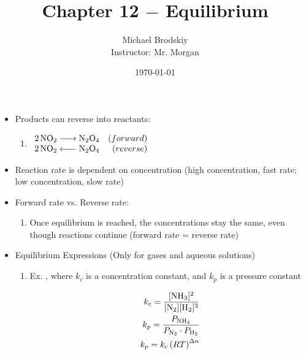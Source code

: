 \documentclass[12pt]{article}
\title{Chapter 12 $-$ Equilibrium}
\date{\today}
\author{Michael Brodskiy\\ \small Instructor: Mr. Morgan}
\begin{document}
\maketitle

\begin{itemize}

  \item Products can reverse into reactants:

    \begin{enumerate}

      \item $
        \begin{array}{l r}
          \ce{2NO2 -> N2O4} & (forward)\\
          \ce{2NO2 <- N2O4} & (reverse)\\
        \end{array}$

    \end{enumerate}

  \item Reaction rate is dependent on concentration (high concentration, fast rate; low concentration, slow rate)

  \item Forward rate vs. Reverse rate:

    \begin{enumerate}

      \item Once equilibrium is reached, the concentrations stay the same, even though reactions continue (forward rate = reverse rate)

    \end{enumerate}

  \item Equilibrium Expressions (Only for gases and aqueous solutions)

    \begin{enumerate}

      \item Ex. , where $k_c$ is a concentration constant, and $k_p$ is a pressure constant

        \begin{equation}
          \begin{split}
            k_c = \frac{[\ce{NH3}]^2}{[\ce{N2}][\ce{H2}]^3}\\
          k_p = \frac{P_{\ce{NH3}}}{P_{\ce{N2}}\cdot P_{\ce{H2}}}\\
          k_p=k_c\left( RT \right)^{\Delta n}
        \end{split}
          \label{1}
        \end{equation}


\end{enumerate}
\end{itemize}
\end{document}
